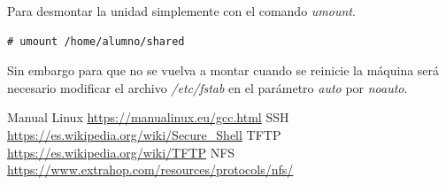\documentclass[12pt]{article}
\begin{document}
Para desmontar la unidad simplemente con el comando \emph{umount}.

\begin{lstlisting}[frame=single]
# umount /home/alumno/shared
\end{lstlisting}

 Sin embargo para que no se vuelva a montar cuando se reinicie la máquina será necesario modificar el archivo \emph{/etc/fstab} en el parámetro \emph{auto} por \emph{noauto}.
\newpage
\begin{thebibliography}{99}
 Manual Linux \url{https://manualinux.eu/gcc.html}
 SSH \url{https://es.wikipedia.org/wiki/Secure_Shell}
 TFTP \url{https://es.wikipedia.org/wiki/TFTP}
 NFS \url{https://www.extrahop.com/resources/protocols/nfs/}
\end{thebibliography}
\end{document}
